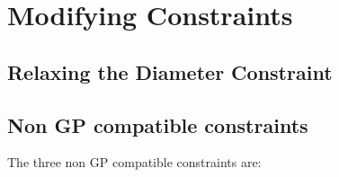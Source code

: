 \documentclass[12pt]{article}
\begin{document}
	\section{Modifying Constraints}

	\subsection{Relaxing the Diameter Constraint}
		
	\subsection{Non GP compatible constraints}
	The three non GP compatible constraints are:
	
	
	
\end{document}
